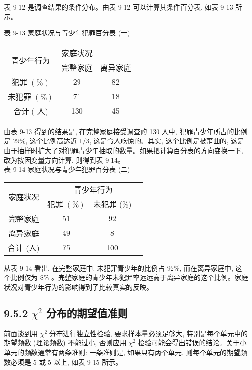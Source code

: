 \documentclass[10pt]{article}
\begin{document}
\begin{CJK*}{UTF8}{bsmi}
表 9-12 是调查结果的条件分布。由表 9-12 可以计算其条件百分表, 如表 9-13 所示。

表 9-13 家庭状况与青少年犯罪百分表 (一)

\begin{center}
\begin{tabular}{ccc}
\hline
\multirow{2}{*}{青少年行为} & 家庭状况 &  \\
\cline { 2 - 4 }
 & 完整家庭 & 离异家庭 \\
\hline
犯罪 $(\%)$ & 29 & 82 \\
未犯罪 $(\%)$ & 71 & 18 \\
\hline
合计 $($ 人) & 130 & 45 \\
\hline
\end{tabular}
\end{center}

由表 9-13 得到的结果是, 在完整家庭接受调查的 130 人中, 犯罪青少年所占的比例是 $29 \%$, 这个比例高达近 $1 / 3$, 这是令人吃惊的。其实, 这个比例是被歪曲的, 这是由于抽样时扩大了对犯罪青少年抽取的数量。如果把计算百分表的方向变换一下, 改为按因变量方向计算, 则得到表 9-14。\\
表 9-14 家庭状况与青少年犯罪百分表 (二)

\begin{center}
\begin{tabular}{ccc}
\hline
\multirow{2}{*}{家庭状况} & \multicolumn{3}{c}{青少年行为} \\
\cline { 2 - 3 }
 & 犯罪 $(\%)$ & 未犯罪 (\%) &  \\
\hline
完整家庭 & 51 & 92 &  \\
离异家庭 & 49 & 8 &  \\
\hline
合计 (人) & 75 & 100 &  \\
\hline
\end{tabular}
\end{center}

从表 9-14 看出, 在完整家庭中, 未犯罪青少年的比例占 92\%, 而在离异家庭中, 这个比例仅为 $8 \%$ 。完整家庭的青少年未犯罪率远远高于离异家庭的这个比例。家庭状况对青少年行为的影响得到了比较真实的反映。

\subsection*{9.5.2 $\chi^{2}$ 分布的期望值准则}
前面谈到用 $\chi^{2}$ 分布进行独立性检验, 要求样本量必须足够大, 特别是每个单元中的期望频数 (理论频数) 不能过小, 否则应用 $\chi^{2}$ 检验可能会得出错误的结论。关于小单元的频数通常有两条准则: 一条准则是, 如果只有两个单元, 则每个单元的期望频数必须是 5 或 5 以上, 如表 9-15 所示。


\end{CJK*}
\end{document}
